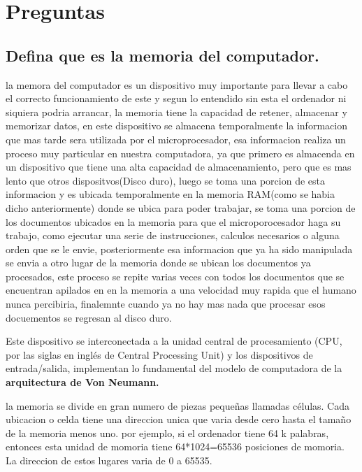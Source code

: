 \documentclass{article}
\begin{document}
\section{Preguntas} \label{contenido}

\subsection{Defina que es la memoria del computador.}
la memora del computador es un dispositivo muy importante para llevar a cabo el correcto funcionamiento de este y segun lo entendido sin esta el ordenador ni siquiera podria arrancar, la memoria tiene la capacidad de retener, almacenar y memorizar datos, en este dispositivo se almacena temporalmente la informacion que mas tarde sera utilizada por el microprocesador, esa informacion realiza un proceso muy particular en nuestra computadora, ya que primero es almacenda en un dispositivo que tiene una alta capacidad de almacenamiento, pero que es mas lento que otros dispositvos(Disco duro), luego se toma una porcion de esta informacion y es ubicada temporalmente en la memoria RAM(como se habia dicho anteriormente) donde se ubica para poder trabajar, se toma una porcion de los documentos ubicados en la memoria para que el microporocesador haga su trabajo, como ejecutar una serie de instrucciones, calculos necesarios o alguna orden que se le envie, posteriormente esa informacion que ya ha sido manipulada se envia a otro lugar de la memoria donde se ubican los documentos ya procesados, este proceso se repite varias veces con todos los documentos que se encuentran apilados en en la memoria a una velocidad muy rapida que el humano nunca percibiria, finalemnte cuando ya no hay mas nada que procesar esos docuementos se regresan al disco duro. 

\vspace{0.5cm}
Este dispositivo se interconectada a la unidad central de procesamiento (CPU, por las siglas en inglés de Central Processing Unit) y los dispositivos de entrada/salida, implementan lo fundamental del modelo de computadora de la \textbf{arquitectura de Von Neumann.}\cite{geniolandia}

\vspace{0.5cm}
la memoria se divide en gran numero de piezas pequeñas llamadas células. Cada ubicacion o celda tiene una direccion unica que varia desde cero hasta el tamaño de la memoria menos uno. por ejemplo, si el ordenador tiene 64 k palabras, entonces esta unidad de momoria tiene 64*1024=65536 posiciones de momoria. La direccion de estos lugares varia de 0 a 65535. \cite{tutorialspoint}
\end{document}
